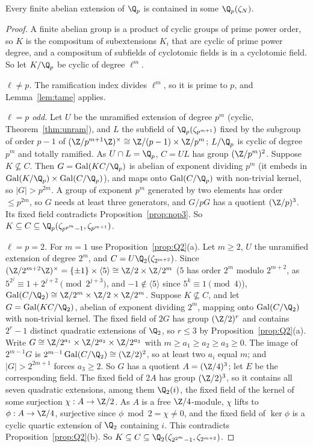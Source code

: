 \begin{theorem}\label{thm:localkw}
Every finite abelian extension of $\Q_p$ is contained in some $\Q_p(\zeta_N)$.
\end{theorem}
\begin{proof}
A finite abelian group is a product of cyclic groups of prime power order, so $K$ is the compositum of subextensions $K_i$ that are cyclic of
prime power degree, and a compositum of subfields of cyclotomic fields is in a cyclotomic field. So let $K/\Q_p$ be cyclic of degree $\ell^m$.

\emph{$\ell\ne p$.} The ramification index divides $\ell^m$, so it is prime to $p$, and Lemma~\ref{lem:tame} applies.

\emph{$\ell=p$ odd.} Let $U$ be the unramified extension of degree $p^m$ (cyclic, Theorem~\ref{thm:unram}), and $L$ the subfield of
$\Q_p(\zeta_{p^{m+1}})$ fixed by the subgroup of order $p-1$ of $(\Z/p^{m+1}\Z)^\times\cong\Z/(p-1)\times\Z/p^m$; $L/\Q_p$ is cyclic of degree $p^m$ and
totally ramified. As $U\cap L=\Q_p$, $C=UL$ has group $(\Z/p^m)^2$. Suppose $K\not\subseteq C$. Then $G=\operatorname{Gal}(KC/\Q_p)$ is abelian of exponent
dividing $p^m$ (it embeds in $\operatorname{Gal}(K/\Q_p)\times\operatorname{Gal}(C/\Q_p)$), and maps onto $\operatorname{Gal}(C/\Q_p)$ with non-trivial kernel, so
$|G|>p^{2m}$. A group of exponent $p^m$ generated by two elements has order $\le p^{2m}$, so $G$ needs at least three generators, and $G/pG$ has a
quotient $(\Z/p)^3$. Its fixed field contradicts Proposition~\ref{prop:nop3}. So $K\subseteq C\subseteq\Q_p(\zeta_{p^{p^m}-1},\zeta_{p^{m+1}})$.

\emph{$\ell=p=2$.} For $m=1$ use Proposition~\ref{prop:Q2}(a). Let $m\ge2$, $U$ the unramified extension of degree $2^m$, and
$C=U\Q_2(\zeta_{2^{m+2}})$. Since $(\Z/2^{m+2}\Z)^\times=\{\pm1\}\times\langle5\rangle\cong\Z/2\times\Z/2^m$ ($5$ has order $2^m$ modulo $2^{m+2}$, as
$5^{2^j}\equiv1+2^{j+2}\pmod{2^{j+3}}$, and $-1\notin\langle5\rangle$ since $5^k\equiv1\pmod4$), $\operatorname{Gal}(C/\Q_2)\cong\Z/2^m\times\Z/2\times\Z/2^m$. Suppose
$K\not\subseteq C$, and let $G=\operatorname{Gal}(KC/\Q_2)$, abelian of exponent dividing $2^m$, mapping onto $\operatorname{Gal}(C/\Q_2)$ with non-trivial kernel.
The fixed field of $2G$ has group $(\Z/2)^r$ and contains $2^r-1$ distinct quadratic extensions of $\Q_2$, so $r\le3$ by
Proposition~\ref{prop:Q2}(a). Write $G\cong\Z/2^{a_1}\times\Z/2^{a_2}\times\Z/2^{a_3}$ with $m\ge a_1\ge a_2\ge a_3\ge0$. The image of $2^{m-1}G$ is
$2^{m-1}\operatorname{Gal}(C/\Q_2)\cong(\Z/2)^2$, so at least two $a_i$ equal $m$; and $|G|>2^{2m+1}$ forces $a_3\ge2$. So $G$ has a quotient
$A=(\Z/4)^3$; let $E$ be the corresponding field. The fixed field of $2A$ has group $(\Z/2)^3$, so it contains all seven quadratic extensions,
among them $\Q_2(i)$, the fixed field of the kernel of some surjection $\chi:A\to\Z/2$. As $A$ is a free $\Z/4$-module, $\chi$ lifts to $\phi:A\to\Z/4$,
surjective since $\phi\bmod2=\chi\ne0$, and the fixed field of $\ker\phi$ is a cyclic quartic extension of $\Q_2$ containing $i$. This contradicts
Proposition~\ref{prop:Q2}(b). So $K\subseteq C\subseteq\Q_2(\zeta_{2^{2^m}-1},\zeta_{2^{m+2}})$.
\end{proof}

